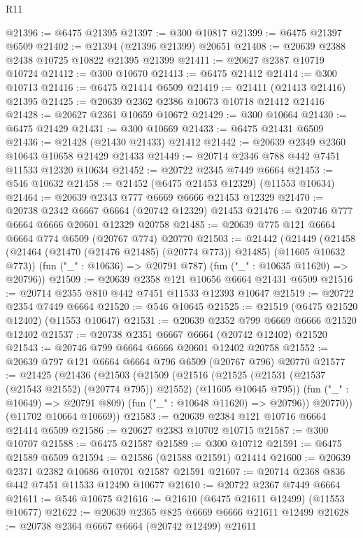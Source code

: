 \begin{lexlean}{R11}
\begin{coremodule}
{{{{{{{{{{{{{{{{{{{{{{{{{{{{{{{{{{{{{{{{{{{{{{{{{{{{{{{{{{{{{{{{{{{{{{{{{{{{{{{{{{@21396 := @6475 @21395
@21397 := @300 @10817
@21399 := @6475 @21397 @6509
@21402 := @21394 (@21396 @21399) @20651
@21408 := @20639 @2388 @2438 @10725 @10822 @21395 @21399
@21411 := @20627 @2387 @10719 @10724
@21412 := @300 @10670
@21413 := @6475 @21412
@21414 := @300 @10713
@21416 := @6475 @21414 @6509
@21419 := @21411 (@21413 @21416) @21395
@21425 := @20639 @2362 @2386 @10673 @10718 @21412 @21416
@21428 := @20627 @2361 @10659 @10672
@21429 := @300 @10664
@21430 := @6475 @21429
@21431 := @300 @10669
@21433 := @6475 @21431 @6509
@21436 := @21428 (@21430 @21433) @21412
@21442 := @20639 @2349 @2360 @10643 @10658 @21429 @21433
@21449 := @20714 @2346 @788 @442 @7451 @11533 @12320 @10634
@21452 := @20722 @2345 @7449 @6664
@21453 := @546 @10632
@21458 := @21452 (@6475 @21453 @12329) (@11553 @10634)
@21464 := @20639 @2343 @777 @6669 @6666 @21453 @12329
@21470 := @20738 @2342 @6667 @6664 (@20742 @12329) @21453
@21476 := @20746 @777 @6664 @6666 @20601 @12329 @20758
@21485 := @20639 @775 @121 @6664 @6664 @774 @6509 (@20767 @774) @20770
@21503 := @21442
    (@21449
      (@21458 (@21464 (@21470 (@21476 @21485) (@20774 @773)) @21485) (@11605 @10632 @773))
      (fun ("_" : @10636) => @20791 @787)
      (fun ("_" : @10635 @11620) => @20796))
@21509 := @20639 @2358 @121 @10656 @6664 @21431 @6509
@21516 := @20714 @2355 @810 @442 @7451 @11533 @12393 @10647
@21519 := @20722 @2354 @7449 @6664
@21520 := @546 @10645
@21525 := @21519 (@6475 @21520 @12402) (@11553 @10647)
@21531 := @20639 @2352 @799 @6669 @6666 @21520 @12402
@21537 := @20738 @2351 @6667 @6664 (@20742 @12402) @21520
@21543 := @20746 @799 @6664 @6666 @20601 @12402 @20758
@21552 := @20639 @797 @121 @6664 @6664 @796 @6509 (@20767 @796) @20770
@21577 := @21425
    (@21436
      (@21503
        (@21509
          (@21516
            (@21525 (@21531 (@21537 (@21543 @21552) (@20774 @795)) @21552) (@11605 @10645 @795))
            (fun ("_" : @10649) => @20791 @809)
            (fun ("_" : @10648 @11620) => @20796))
          @20770))
      (@11702 @10664 @10669))
@21583 := @20639 @2384 @121 @10716 @6664 @21414 @6509
@21586 := @20627 @2383 @10702 @10715
@21587 := @300 @10707
@21588 := @6475 @21587
@21589 := @300 @10712
@21591 := @6475 @21589 @6509
@21594 := @21586 (@21588 @21591) @21414
@21600 := @20639 @2371 @2382 @10686 @10701 @21587 @21591
@21607 := @20714 @2368 @836 @442 @7451 @11533 @12490 @10677
@21610 := @20722 @2367 @7449 @6664
@21611 := @546 @10675
@21616 := @21610 (@6475 @21611 @12499) (@11553 @10677)
@21622 := @20639 @2365 @825 @6669 @6666 @21611 @12499
@21628 := @20738 @2364 @6667 @6664 (@20742 @12499) @21611
}}}}}}}}}}}}}}}}}}}}}}}}}}}}}}}}}}}}}}}}}}}}}}}}}}}}}}}}}}}}}}}}}}}}}}}}}}}}}}}}}}
\end{coremodule}
\end{lexlean}
